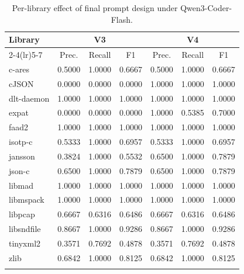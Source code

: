 \documentclass[pdflatex,sn-basic]{sn-jnl}%
\renewcommand{\arraystretch}{1.16}%
\theoremstyle{thmstyleone}%
\theoremstyle{thmstyletwo}%
\theoremstyle{thmstylethree}%
\begin{document}
\begin{table}[!htbp]
\caption{Per-library effect of final prompt design under {\color{blue}Qwen3-Coder-Flash}.}
\label{tab:per-library-final-prompt}
\centering
\scriptsize
\setlength{\tabcolsep}{2.2pt}
\renewcommand{\arraystretch}{1.08}
\begin{tabular*}{\linewidth}{@{\extracolsep{\fill}}lcccccc}
\toprule
Library & \multicolumn{3}{c}{V3} & \multicolumn{3}{c}{V4} \\
\cmidrule(lr){2-4}\cmidrule(lr){5-7}
& Prec. & Recall & F1 & Prec. & Recall & F1 \\
\midrule
c-ares & {\color{blue}0.5000} & 1.0000 & {\color{blue}0.6667} & {\color{blue}0.5000} & 1.0000 & {\color{blue}0.6667} \\
cJSON & 0.0000 & 0.0000 & 0.0000 & 1.0000 & 1.0000 & 1.0000 \\
dlt-daemon & {\color{blue}1.0000} & {\color{blue}1.0000} & {\color{blue}1.0000} & {\color{blue}1.0000} & {\color{blue}1.0000} & {\color{blue}1.0000} \\
expat & {\color{blue}0.0000} & {\color{blue}0.0000} & {\color{blue}0.0000} & {\color{blue}1.0000} & {\color{blue}0.5385} & {\color{blue}0.7000} \\
faad2 & {\color{blue}1.0000} & 1.0000 & {\color{blue}1.0000} & {\color{blue}1.0000} & 1.0000 & {\color{blue}1.0000} \\
isotp-c & {\color{blue}0.5333} & {\color{blue}1.0000} & {\color{blue}0.6957} & {\color{blue}0.5333} & {\color{blue}1.0000} & {\color{blue}0.6957} \\
jansson & {\color{blue}0.3824} & 1.0000 & {\color{blue}0.5532} & {\color{blue}0.6500} & 1.0000 & {\color{blue}0.7879} \\
json-c & 0.6500 & 1.0000 & 0.7879 & {\color{blue}0.6500} & {\color{blue}1.0000} & {\color{blue}0.7879} \\
libmad & 1.0000 & 1.0000 & 1.0000 & 1.0000 & 1.0000 & 1.0000 \\
libmspack & 1.0000 & 1.0000 & 1.0000 & 1.0000 & 1.0000 & 1.0000 \\
libpcap & {\color{blue}0.6667} & {\color{blue}0.6316} & {\color{blue}0.6486} & {\color{blue}0.6667} & {\color{blue}0.6316} & {\color{blue}0.6486} \\
libsndfile & 0.8667 & 1.0000 & 0.9286 & 0.8667 & 1.0000 & 0.9286 \\
tinyxml2 & {\color{blue}0.3571} & {\color{blue}0.7692} & {\color{blue}0.4878} & {\color{blue}0.3571} & {\color{blue}0.7692} & {\color{blue}0.4878} \\
zlib & {\color{blue}0.6842} & 1.0000 & {\color{blue}0.8125} & {\color{blue}0.6842} & 1.0000 & {\color{blue}0.8125} \\
\botrule
\end{tabular*}
\end{table}
\end{document}
